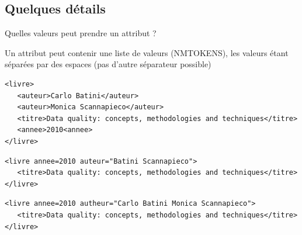 \subsection{Quelques d\'etails}

\begin{frame}[containsverbatim]{Quelles valeurs peut prendre un attribut ?}

Un attribut peut contenir une liste de valeurs (NMTOKENS), les valeurs \'etant s\'epar\'ees par des espaces (pas d'autre s\'eparateur possible)

\begin{lstlisting}
<livre>
   <auteur>Carlo Batini</auteur>
   <auteur>Monica Scannapieco</auteur>
   <titre>Data quality: concepts, methodologies and techniques</titre>
   <annee>2010<annee>
</livre>
\end{lstlisting}

\begin{lstlisting}
<livre annee=2010 auteur="Batini Scannapieco">
   <titre>Data quality: concepts, methodologies and techniques</titre>
</livre>
\end{lstlisting}


\begin{lstlisting}
<livre annee=2010 autheur="Carlo Batini Monica Scannapieco">
   <titre>Data quality: concepts, methodologies and techniques</titre>
</livre>
\end{lstlisting}
\end{frame}




